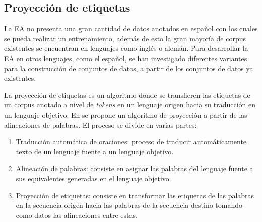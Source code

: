 \documentclass[a4paper,11pt,twocolumn,twoside]{article}
\begin{document}

\subsection{Proyección de etiquetas} %

La EA no presenta una gran cantidad de datos anotados en español con los cuales se pueda realizar 
un entrenamiento, además de esto la gran mayoría de corpus existentes se encuentran en lenguajes como inglés o alemán.
Para desarrollar la EA en otros lenguajes, como el español, se han investigado diferentes variantes
para la construcción de conjuntos de datos, a partir de los conjuntos de datos ya existentes.

La proyección de etiquetas es un algoritmo donde se 
transfieren las etiquetas de un corpus anotado a nivel de \textit{tokens} en un lenguaje origen hacia su traducción en un
lenguaje objetivo. En \cite{eger2018cross} se propone un algoritmo de proyección a partir de las alineaciones de 
palabras. El proceso se divide en varias partes:

\begin{enumerate}
	\item Traducción automática de oraciones: proceso de
	traducir automáticamente texto de un lenguaje fuente a un lenguaje objetivo.
	\item Alineación de palabras: consiste en asignar las palabras del lenguaje fuente
	a sus equivalentes generadas en el lenguaje objetivo.
	\item Proyección de etiquetas: consiste en transformar las etiquetas de las palabras en la secuencia origen
	hacia las palabras de la secuencia destino tomando como datos las alineaciones entre estas.
\end{enumerate}
\end{document}
